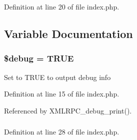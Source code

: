 Definition at line 20 of file index.php.

\subsection{Variable Documentation}
\hypertarget{index_8php_85ae3e64cd40e9564adceb010085e9dd}{
\subsubsection{\setlength{\rightskip}{0pt plus 5cm}\$debug = TRUE}}
\label{index_8php_85ae3e64cd40e9564adceb010085e9dd}


Set to TRUE to output debug info 

Definition at line 15 of file index.php.

Referenced by XMLRPC\_\-debug\_\-print().\hypertarget{index_8php_8bd4accafd4e712317ed9a471738a971}{
\subsubsection{}}
\label{index_8php_8bd4accafd4e712317ed9a471738a971}




Definition at line 28 of file index.php.